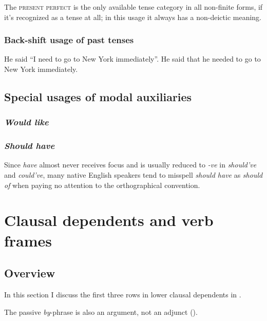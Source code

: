 \documentclass[UTF8, a4paper, oneside, scheme=plain, 12pt]{ctexbook}
\newcommand{\form}[1]{\emph{#1}}
\newcommand{\category}[1]{\textsc{#1}}
\begin{document}
The \category{present perfect} is the only available tense category
in all non-finite forms, 
if it's recognized as a tense at all;
in this usage it always has a non-deictic meaning. 

\subsubsection{Back-shift usage of past tenses}

\begin{exe}
    \ex \begin{xlist}
        \ex He said ``I need to go to New York immediately''.
        \ex He said that he needed to go to New York immediately.
    \end{xlist}
\end{exe}

\subsection{Special usages of modal auxiliaries}\label{sec:verb-inflection.modal-use}

\subsubsection{\form{Would like}}

\subsubsection{\form{Should have}}

Since \form{have} almost never receives focus
and is usually reduced to \form{-ve} in \form{should've} and \form{could've},
many native English speakers 
tend to misspell \form{should have} as \form{should of}
when paying no attention to the orthographical convention.

\section{Clausal dependents and verb frames}\label{sec:valency.overview}

\subsection{Overview}

In this section I discuss the first three rows in 
lower clausal dependents in .

The passive \form{by}-phrase is also an argument, not an adjunct 
().
\end{document}
